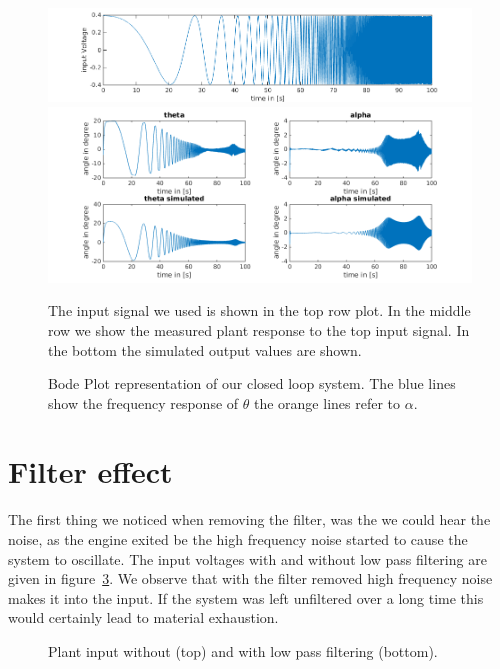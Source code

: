 \documentclass[ twoside,openright,titlepage,numbers=noenddot,headinclude,%
                footinclude=true,cleardoublepage=empty,abstractoff, %
                BCOR=5mm,paper=a4,fontsize=11pt,%
                ngerman,american,%
                ]{scrreprt}
\begin{document}
\begin{figure}
\includegraphics[scale = 0.5]{images/input.png}
\includegraphics[scale = 0.505]{images/measSim2.png}
\caption{The input signal we used is shown in the top row plot. In the middle row we show the measured plant response to the top input signal. In the bottom the simulated output values are shown. }
\label{fig:timeDomain}
\end{figure}
\begin{figure}

%
\caption{Bode Plot representation of our closed loop system. The blue lines show the frequency response of $\theta$ the orange lines refer to $\alpha$.}
\label{fig:frequencyDomain}
\end{figure}

\section{Filter effect}
The first thing we noticed when removing the filter, was the we could hear the noise, as the engine exited be the high frequency noise started to cause the system to oscillate. The input voltages with and without low pass filtering are given in figure~\ref{fig:noise}. We observe that with the filter removed high frequency noise makes it into the input. If the system was left unfiltered over a long time this would certainly lead to material exhaustion. 
\begin{figure}

\caption{Plant input without (top) and with low pass filtering (bottom).}
\label{fig:noise}
\end{figure}
\end{document}
